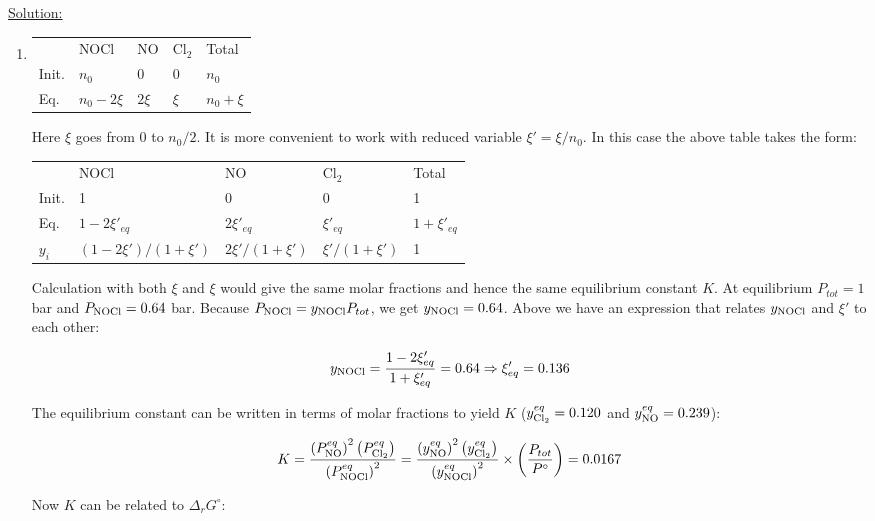 \noindent
\underline{Solution:}

\begin{enumerate}

\item

\begin{tabular}{lllll}
      & NOCl & NO & Cl$_2$ & Total\\
Init. & $n_0$& 0  & 0      & $n_0$\\
Eq.   & $n_0 - 2\xi$ & $2\xi$ & $\xi$ & $n_0 + \xi$\\
\end{tabular}

Here $\xi$ goes from 0 to $n_0/2$. It is more convenient to work with reduced variable $\xi' = \xi/n_0$. In this case the above table takes the form:

\begin{tabular}{lllll}
      & NOCl & NO & Cl$_2$ & Total\\
Init. & 1 & 0  & 0      & 1\\
Eq.   & $1 - 2\xi'_{eq}$ & $2\xi'_{eq}$ & $\xi'_{eq}$ & $1 + \xi'_{eq}$\\
$y_i$ & $(1 - 2\xi')/(1+\xi')$ & $2\xi'/(1+\xi')$ & $\xi'/(1+\xi')$ & 1\\
\end{tabular}

Calculation with both $\xi$ and $\xi$ would give the same molar fractions and hence the same equilibrium constant $K$. At equilibrium $P_{tot} = 1$ bar and $P_{\textnormal{NOCl}} = 0.64$ bar. Because $P_{\textnormal{NOCl}} = y_{\textnormal{NOCl}}P_{tot}$, we get $y_{\textnormal{NOCl}} = 0.64$. Above we have an expression that relates $y_{\textnormal{NOCl}}$ and $\xi'$ to each other:

$$y_{\textnormal{NOCl}} = \frac{1 - 2\xi'_{eq}}{1 + \xi'_{eq}} = 0.64\Rightarrow \xi'_{eq} = 0.136$$

The equilibrium constant can be written in terms of molar fractions to yield $K$ ($y_{\textnormal{Cl}_2}^{eq} = 0.120$ and $y_{\textnormal{NO}}^{eq} = 0.239$):

$$K = \frac{\left(P_{\textnormal{NO}}^{eq}\right)^2\left(P_{\textnormal{Cl}_2}^{eq}\right)}{\left(P_{\textnormal{NOCl}}^{eq}\right)^2} = \frac{\left(y_{\textnormal{NO}}^{eq}\right)^2\left(y_{\textnormal{Cl}_2}^{eq}\right)}{\left(y_{\textnormal{NOCl}}^{eq}\right)^2}\times\left(\frac{P_{tot}}{P^\circ}\right) = 0.0167$$

Now $K$ can be related to $\Delta_rG^\circ$:


\end{enumerate}
